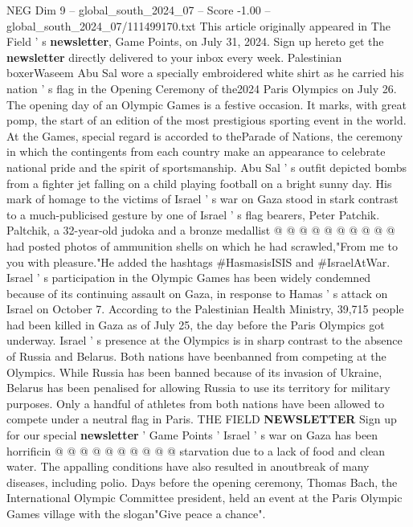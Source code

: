 \begin{textsample}{NEG Dim 9 – global\_south\_2024\_07 – Score -1.00 – global\_south\_2024\_07/111499170.txt}  \label{ex:f9_neg_353}
This article originally appeared in The Field ' s \textbf{newsletter}, Game Points, on July 31, 2024.
Sign up hereto get the \textbf{newsletter} directly delivered to your inbox every week.
Palestinian boxerWaseem Abu Sal wore a specially embroidered white shirt as he carried his nation ' s flag in the Opening Ceremony of the2024 Paris Olympics on July 26.
The opening day of an Olympic Games is a festive occasion.
It marks, with great pomp, the start of an edition of the most prestigious sporting event in the world.
At the Games, special regard is accorded to theParade of Nations, the ceremony in which the contingents from each country make an appearance to celebrate national pride and the spirit of sportsmanship.
Abu Sal ' s outfit depicted bombs from a fighter jet falling on a child playing football on a bright sunny day.
His mark of homage to the victims of Israel ' s war on Gaza stood in stark contrast to a much-publicised gesture by one of Israel ' s flag bearers, Peter Patchik.
Paltchik, a 32-year-old judoka and a bronze medallist @ @ @ @ @ @ @ @ @ @ had posted photos of ammunition shells on which he had scrawled,"From me to you with pleasure."He added the hashtags \#HasmasisISIS and \#IsraelAtWar.
Israel ' s participation in the Olympic Games has been widely condemned because of its continuing assault on Gaza, in response to Hamas ' s attack on Israel on October 7.
According to the Palestinian Health Ministry, 39,715 people had been killed in Gaza as of July 25, the day before the Paris Olympics got underway.
Israel ' s presence at the Olympics is in sharp contrast to the absence of Russia and Belarus.
Both nations have beenbanned from competing at the Olympics.
While Russia has been banned because of its invasion of Ukraine, Belarus has been penalised for allowing Russia to use its territory for military purposes.
Only a handful of athletes from both nations have been allowed to compete under a neutral flag in Paris.
THE FIELD \textbf{NEWSLETTER} Sign up for our special \textbf{newsletter} ' Game Points ' Israel ' s war on Gaza has been horrificin @ @ @ @ @ @ @ @ @ @ starvation due to a lack of food and clean water.
The appalling conditions have also resulted in anoutbreak of many diseases, including polio.
Days before the opening ceremony, Thomas Bach, the International Olympic Committee president, held an event at the Paris Olympic Games village with the slogan"Give peace a chance".

\end{textsample}
